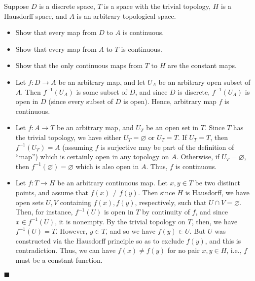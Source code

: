 \documentclass[12pt]{article}
\renewcommand{\qed}{\hfill$\blacksquare$}
\renewenvironment{proof}{\begin{addmargin}[1em]{0em}\begin{newproof}}{\end{newproof}\end{addmargin}\qed}
\newenvironment{problem}[2][Problem]{\begin{trivlist}
\item[\hskip \labelsep {\bfseries #1}\hskip \labelsep {\bfseries #2.}]}{\end{trivlist}}
\begin{document}
\begin{problem}{2-9}
Suppose $D$ is a discrete space, $T$ is a space with the trivial topology, $H$ is a Hausdorff space, and $A$ is an arbitrary topological space.
\begin{itemize}
	\item Show that every map from $D$ to $A$ is continuous.
	\item Show that every map from $A$ to $T$ is continuous.
	\item Show that the only continuous maps from $T$ to $H$ are the constant maps.
\end{itemize}
\end{problem}
\begin{proof}
\begin{itemize}
	\item Let $f:D\rightarrow A$ be an arbitrary map, and let $U_A$ be an arbitrary open subset of $A$. Then $f^{-1}\left(U_A\right)$ is some subset of $D$, and since $D$ is discrete, $f^{-1}\left(U_A\right)$ is open in $D$ (since every subset of $D$ is open). Hence, arbitrary map $f$ is continuous.
	\item Let $f:A\rightarrow T$ be an arbitrary map, and $U_T$ be an open set in $T$. Since $T$ has the trivial topology, we have either $U_T=\varnothing$ or $U_T=T$. If $U_T=T$, then $f^{-1}\left(U_T\right) = A$ {\color{red}(assuming $f$ is surjective may be part of the definition of ``map'')} which is certainly open in any topology on $A$. Otherwise, if $U_T=\varnothing$, then $f^{-1}\left(\varnothing\right) = \varnothing$ which is also open in $A$. Thus, $f$ is continuous.
	\item Let $f:T\rightarrow H$ be an arbitrary continuous map. Let $x,y\in T$ be two distinct points, and assume that $f\left(x\right)\neq f\left(y\right)$. Then since $H$ is Hausdorff, we have open sets $U,V$ containing $f\left(x\right),f\left(y\right)$, respectively, such that $U\cap V = \varnothing$. Then, for instance, $f^{-1}\left(U\right)$ is open in $T$ by continuity of $f$, and since $x \in f^{-1}\left(U\right)$, it is nonempty. By the trivial topology on $T$, then, we have $f^{-1}\left(U\right)=T$. However, $y\in T$, and so we have $f\left(y\right)\in U$. But $U$ was constructed via the Hausdorff principle so as to exclude $f\left(y\right)$, and this is contradiction. Thus, we can have $f\left(x\right)\neq f\left(y\right)$ for no pair $x,y\in H$, i.e., $f$ must be a constant function.
\end{itemize}
\end{proof}
\end{document}
